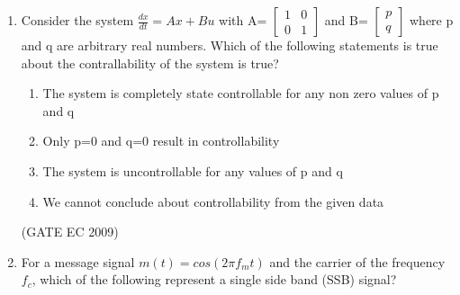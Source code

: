 \documentclass[journal,12pt,onecolumn]{IEEEtran}
\theoremstyle{remark}
\begin{document}
\begin{enumerate}[start=1, label={Q\arabic*.}]
\item Consider the system $\frac{dx}{dt} = Ax +Bu$ with A= 
$\begin{bmatrix}
  1 & 0\\ 
  0 & 1
\end{bmatrix}$ and B= 
$\begin{bmatrix}
  p\\ 
  q
\end{bmatrix}$ where p and q are arbitrary real numbers. Which of the following statements is true about the contrallability of the system is true?

\begin{enumerate}[label=(\Alph*)]
\item The system is completely state controllable for any non zero values of p and q
\item Only p=0 and q=0 result in controllability
\item The system is uncontrollable for any values of p and q
\item We cannot conclude about controllability from the given data
\end{enumerate}
\hfill (GATE EC 2009)

\item For a message signal $m(t) = cos(2\pi f_m t)$ and the carrier of the frequency ${f_c}$, which of the following represent a single side band (SSB) signal?
\begin{enumerate}
\end{enumerate}


\end{enumerate}
\end{document}
